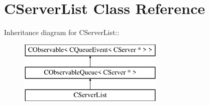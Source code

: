 \section{CServerList Class Reference}
\label{classCServerList}
Inheritance diagram for CServerList::\begin{figure}[H]
\begin{center}
\leavevmode
\includegraphics[height=3cm]{classCServerList}
\end{center}
\end{figure}

